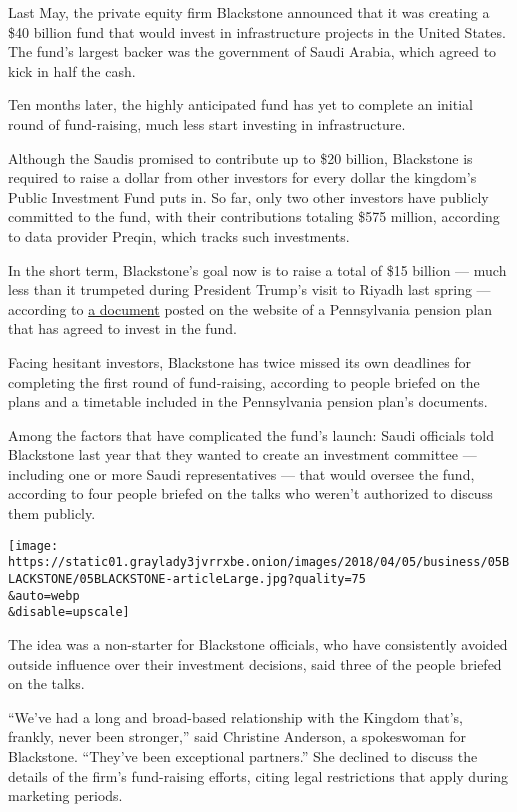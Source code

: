 Last May, the private equity firm Blackstone announced that it was
creating a \$40 billion fund that would invest in infrastructure
projects in the United States. The fund's largest backer was the
government of Saudi Arabia, which agreed to kick in half the cash.

Ten months later, the highly anticipated fund has yet to complete an
initial round of fund-raising, much less start investing in
infrastructure.

Although the Saudis promised to contribute up to \$20 billion,
Blackstone is required to raise a dollar from other investors for every
dollar the kingdom's Public Investment Fund puts in. So far, only two
other investors have publicly committed to the fund, with their
contributions totaling \$575 million, according to data provider Preqin,
which tracks such investments.

In the short term, Blackstone's goal now is to raise a total of \$15
billion --- much less than it trumpeted during President Trump's visit
to Riyadh last spring --- according to
\href{http://www.psers.pa.gov/About/Board/Resolutions/Documents/2018/res02.pdf}{a
document} posted on the website of a Pennsylvania pension plan that has
agreed to invest in the fund.

Facing hesitant investors, Blackstone has twice missed its own deadlines
for completing the first round of fund-raising, according to people
briefed on the plans and a timetable included in the Pennsylvania
pension plan's documents.

Among the factors that have complicated the fund's launch: Saudi
officials told Blackstone last year that they wanted to create an
investment committee --- including one or more Saudi representatives ---
that would oversee the fund, according to four people briefed on the
talks who weren't authorized to discuss them publicly.

\texttt{[image: https://static01.graylady3jvrrxbe.onion/images/2018/04/05/business/05BLACKSTONE/05BLACKSTONE-articleLarge.jpg?quality=75\\\&auto=webp\\\&disable=upscale]}

The idea was a non-starter for Blackstone officials, who have
consistently avoided outside influence over their investment decisions,
said three of the people briefed on the talks.

``We've had a long and broad-based relationship with the Kingdom that's,
frankly, never been stronger,'' said Christine Anderson, a spokeswoman
for Blackstone. ``They've been exceptional partners.'' She declined to
discuss the details of the firm's fund-raising efforts, citing legal
restrictions that apply during marketing periods.

